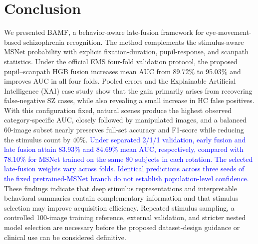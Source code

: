 \documentclass[conference,a4paper]{IEEEtran}
\begin{document}
\section{Conclusion}
We presented BAMF, a behavior-aware late-fusion framework for eye-movement-based schizophrenia recognition. The method complements the stimulus-aware MSNet probability with explicit fixation-duration, pupil-response, and scanpath statistics. Under the official EMS four-fold validation protocol, the proposed pupil--scanpath HGB fusion increases mean AUC from 89.72\% to 95.03\% and improves AUC in all four folds. Pooled errors and the Explainable Artificial Intelligence (XAI) case study show that the gain primarily arises from recovering false-negative SZ cases, while also revealing a small increase in HC false positives. With this configuration fixed, natural scenes produce the highest observed category-specific AUC, closely followed by manipulated images, and a balanced 60-image subset nearly preserves full-set accuracy and F1-score while reducing the stimulus count by 40\%. \textcolor{blue}{Under separated 2/1/1 validation, early fusion and late fusion attain 83.93\% and 84.69\% mean AUC, respectively, compared with 78.10\% for MSNet trained on the same 80 subjects in each rotation. The selected late-fusion weights vary across folds. Identical predictions across three seeds of the fixed pretrained-MSNet branch do not establish population-level confidence.} These findings indicate that deep stimulus representations and interpretable behavioral summaries contain complementary information and that stimulus selection may improve acquisition efficiency. Repeated stimulus sampling, a controlled 100-image training reference, external validation, and stricter nested model selection are necessary before the proposed dataset-design guidance or clinical use can be considered definitive.



\end{document}

